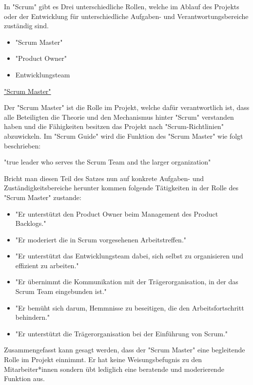 In "Scrum" gibt es Drei unterschiedliche Rollen, welche im Ablauf des Projekts oder der Entwicklung für unterschiedliche Aufgaben- und Verantwortungsbereiche zuständig sind.

\begin{itemize}
    \item "Scrum Master"
    \item "Product Owner"
    \item Entwicklungsteam
\end{itemize}

\cite{Scrum}

\underline{"Scrum Master"}

Der "Scrum Master" ist die Rolle im Projekt, welche dafür verantwortlich ist, dass alle Beteiligten die Theorie und den Mechanismus hinter "Scrum" verstanden haben und die Fähigkeiten besitzen das Projekt nach "Scrum-Richtlinien" abzuwickeln. Im "Scrum Guide" wird die Funktion des "Scrum Master" wie folgt beschrieben:

"true leader who serves the Scrum Team and the larger organization" \cite{ScrumMaster}

Bricht man diesen Teil des Satzes nun auf konkrete Aufgaben- und Zuständigkeitsbereiche herunter kommen folgende Tätigkeiten in der Rolle des "Scrum Master" zustande:

\begin{itemize}
    \item "Er unterstützt den Product Owner beim Management des Product Backlogs." \cite{ScrumMaster}
    \item "Er moderiert die in Scrum vorgesehenen Arbeitstreffen." \cite{ScrumMaster}
    \item "Er unterstützt das Entwicklungsteam dabei, sich selbst zu organisieren und effizient zu arbeiten." \cite{ScrumMaster}
    \item "Er übernimmt die Kommunikation mit der Trägerorganisation, in der das Scrum Team eingebunden ist." \cite{ScrumMaster}
    \item "Er bemüht sich darum, Hemmnisse zu beseitigen, die den Arbeitsfortschritt behindern." \cite{ScrumMaster}
    \item "Er unterstützt die Trägerorganisation bei der Einführung von Scrum." \cite{ScrumMaster}
\end{itemize}

Zusammengefasst kann gesagt werden, dass der "Scrum Master" eine begleitende Rolle im Projekt einnimmt. Er hat keine Weisungsbefugnis zu den Mitarbeiter*innen sondern übt lediglich eine beratende und moderierende Funktion aus.

